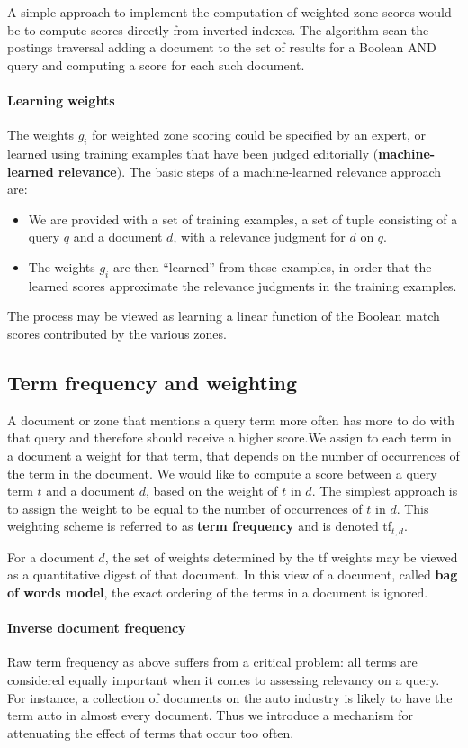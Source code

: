 \documentclass[letterpaper,11pt]{article}
\begin{document}
A simple approach to implement the computation of weighted zone scores would be to compute scores directly from inverted indexes. The algorithm scan the postings traversal adding a document to the set of results for a Boolean AND query and computing a score for each such document.

\paragraph{Learning weights}
The weights $g_i$ for weighted zone scoring could be specified by an expert, or learned using training examples that have been judged editorially (\textbf{machine-learned relevance}). The basic steps of a machine-learned relevance approach are:
\begin{itemize}
    \item We are provided with a set of training examples, a set of tuple consisting of a query $q$ and a document $d$, with a relevance judgment for $d$ on $q$.
    \item The weights $g_i$ are then “learned” from these examples, in order that the learned scores approximate the relevance judgments in the training examples.
\end{itemize}
The process may be viewed as learning a linear function of the Boolean match scores contributed by the various zones.

\subsection{Term frequency and weighting}

A document or zone that mentions a query term more often has more to do with that query and therefore should receive a higher score.We assign to each term in a document a weight for that term, that depends on the number of occurrences of the term in the document. We would like to compute a score between a query term $t$ and a document $d$, based on the weight of $t$ in $d$. The simplest approach is to assign the weight to be equal to the number of occurrences of $t$ in $d$. This weighting scheme is referred to as \textbf{term frequency} and is denoted tf$_{t,d}$.

For a document $d$, the set of weights determined by the tf weights may be viewed as a quantitative digest of that document. In this view of a document, called \textbf{bag of words model}, the exact ordering of the terms in a document is ignored.

\paragraph{Inverse document frequency}
Raw term frequency as above suffers from a critical problem: all terms are considered equally important when it comes to assessing relevancy on a query. For instance, a collection of documents on the auto industry is likely to have the term auto in almost every document. Thus we introduce a mechanism for attenuating the effect of terms that occur too often.
\end{document}
